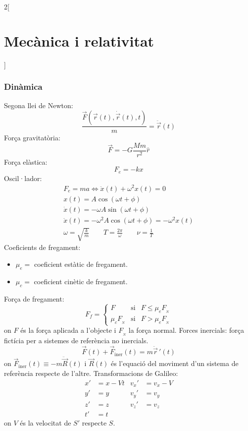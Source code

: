 \documentclass[class=article,10pt,crop=false]{standalone}
\begin{document}
\begin{multicols}{2}[\section{Mecànica i relativitat}]
\subsubsection{Dinàmica}
Segona llei de Newton: $$\frac{\Vec{F}(\Vec{r}(t),\dot{\Vec{r}}(t),t)}{m}=\ddot{\Vec{r}}(t)$$
Força gravitatòria: $$\Vec{F}=-G\frac{Mm}{r^2}\hat{r}$$
Força elàstica: $$F_e=-kx$$
Oscil·lador:
\begin{gather*}
    F_e=ma\iff\ddot{x}(t)+\omega^2x(t)=0\\
    x(t)=A\cos(\omega t+\phi)\\
    \dot{x}(t)=-\omega A\sin(\omega t+\phi)\\
    \ddot{x}(t)=-\omega^2 A\cos(\omega t+\phi)=-\omega^2x(t)\\
    \omega=\sqrt{\frac{k}{m}}\qquad T=\frac{2\pi}{\omega}\qquad\nu=\frac{1}{T}
\end{gather*}
Coeficients de fregament:
\begin{itemize}
    \item $\mu_e=$ coeficient estàtic de fregament.
    \item $\mu_c=$ coeficient cinètic de fregament.
\end{itemize} 
Força de fregament: $$F_f=\left\{
    \begin{array}{rcl}
    F & \text{si} & F\leq\mu_eF_{\!_N} \\
    \mu_cF_{\!_N} & \text{si} & F>\mu_eF_{\!_N}
    \end{array}\right.$$
    {on $F$ és la força aplicada a l'objecte i $F_{\!_N}$ la força normal.}\newline
Forces inercials: força fictícia per a sistemes de referència no inercials. $$\Vec{F}(t)+\Vec{F}_{\text{iner}}(t)=m\ddot{\Vec{r}}\,'(t)$$ {on $\Vec{F}_{\text{iner}}(t)\equiv-m\ddot{\Vec{R}}(t)$ i $\Vec{R}(t)$ és l'equació del moviment d'un sistema de referència respecte de l'altre.}\newline
Transformacions de Galileo:
\begin{align*}
    x'&=x-Vt & v_x'&=v_x-V\\
    y'&=y & v_y'&=v_y\\
    z'&=z & v_z'&=v_z\\
    t'&=t
\end{align*} {on $V$ és la velocitat de $S'$ respecte $S$.}

\end{multicols}
\end{document}
